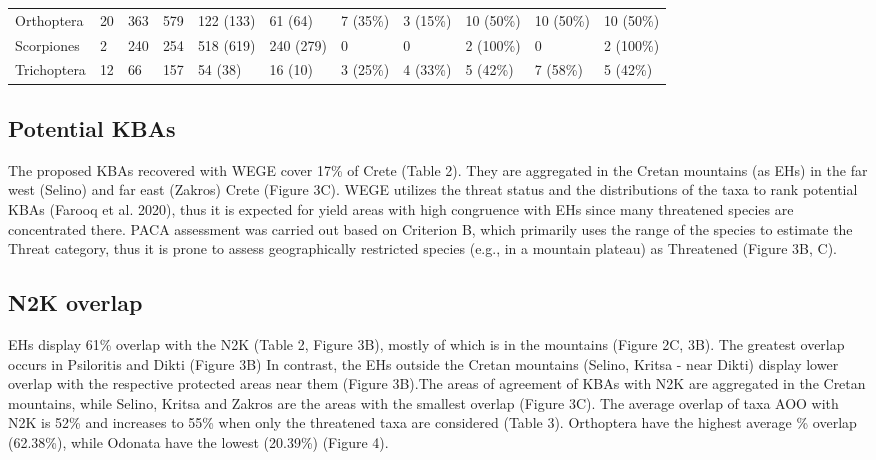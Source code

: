 \begin{sidewaystable}
\begin{tabular}{lllllllllll}
Orthoptera                   & 20   & 363   & 579         & 122 (133)         & 61 (64)                  & 7 (35\%)   & 3 (15\%)  & 10 (50\%) & 10 (50\%)  & 10 (50\%) \\
Scorpiones                   & 2    & 240   & 254         & 518 (619)         & 240 (279)                & 0          & 0         & 2 (100\%) & 0          & 2 (100\%) \\
Trichoptera                  & 12   & 66    & 157         & 54 (38)           & 16 (10)                  & 3 (25\%)   & 4 (33\%)  & 5 (42\%)  & 7 (58\%)   & 5 (42\%) 
\end{tabular}
\label{arthropods-results}
\end{sidewaystable}



\subsection{Potential KBAs}
    \label{subsec:arthropods-potential-kbas}
    
The proposed KBAs recovered with WEGE cover 17\% of Crete (Table 2). They are
aggregated in the Cretan mountains (as EHs) in the far west (Selino) and far
east (Zakros) Crete (Figure 3C). WEGE utilizes the threat status and the
distributions of the taxa to rank potential KBAs (Farooq et al. 2020), thus it
is expected for yield areas with high congruence with EHs since many threatened
species are concentrated there. PACA assessment was carried out based on
Criterion B, which primarily uses the range of the species to estimate the
Threat category, thus it is prone to assess geographically restricted species
(e.g., in a mountain plateau) as Threatened (Figure 3B, C).

    \subsection{N2K overlap}
    \label{subsec:arthropods-n2k-overlap}

EHs display 61\% overlap with the N2K (Table 2, Figure 3B), mostly of which is
in the mountains (Figure 2C, 3B). The greatest overlap occurs in Psiloritis and
Dikti (Figure 3B) In contrast, the EHs outside the Cretan mountains
(Selino, Kritsa - near Dikti) display lower overlap with the respective
protected areas near them (Figure 3B).The areas of agreement of KBAs with N2K
are aggregated in the Cretan mountains, while Selino, Kritsa and Zakros are the
areas with the smallest overlap (Figure 3C). The average overlap of taxa AOO
with N2K is 52\% and increases to 55\% when only the threatened taxa are
considered (Table 3). Orthoptera have the highest average \% overlap (62.38\%),
while Odonata have the lowest (20.39\%) (Figure 4).
    
